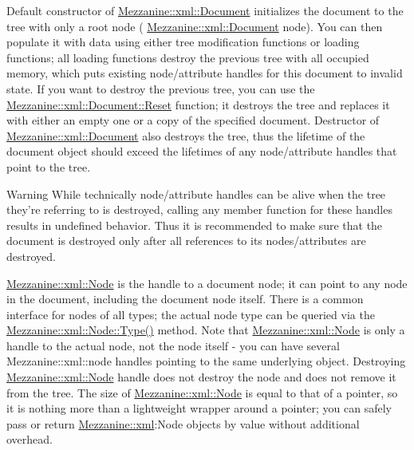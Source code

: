  \par
 Default constructor of \hyperlink{classMezzanine_1_1xml_1_1Document}{Mezzanine::xml::Document} initializes the document to the tree with only a root node ( \hyperlink{classMezzanine_1_1xml_1_1Document}{Mezzanine::xml::Document} node). You can then populate it with data using either tree modification functions or loading functions; all loading functions destroy the previous tree with all occupied memory, which puts existing node/attribute handles for this document to invalid state. If you want to destroy the previous tree, you can use the \hyperlink{classMezzanine_1_1xml_1_1Document_a4fc224fdb19ccc1ca410b4d49fc39f6c}{Mezzanine::xml::Document::Reset} function; it destroys the tree and replaces it with either an empty one or a copy of the specified document. Destructor of \hyperlink{classMezzanine_1_1xml_1_1Document}{Mezzanine::xml::Document} also destroys the tree, thus the lifetime of the document object should exceed the lifetimes of any node/attribute handles that point to the tree. \begin{DoxyWarning}{Warning}
While technically node/attribute handles can be alive when the tree they're referring to is destroyed, calling any member function for these handles results in undefined behavior. Thus it is recommended to make sure that the document is destroyed only after all references to its nodes/attributes are destroyed.
\end{DoxyWarning}
\hyperlink{classMezzanine_1_1xml_1_1Node}{Mezzanine::xml::Node} is the handle to a document node; it can point to any node in the document, including the document node itself. There is a common interface for nodes of all types; the actual node type can be queried via the \hyperlink{classMezzanine_1_1xml_1_1Node_a939a7a98e48ca8abb3349909586dd081}{Mezzanine::xml::Node::Type()} method. Note that \hyperlink{classMezzanine_1_1xml_1_1Node}{Mezzanine::xml::Node} is only a handle to the actual node, not the node itself -\/ you can have several Mezzanine::xml::node handles pointing to the same underlying object. Destroying \hyperlink{classMezzanine_1_1xml_1_1Node}{Mezzanine::xml::Node} handle does not destroy the node and does not remove it from the tree. The size of \hyperlink{classMezzanine_1_1xml_1_1Node}{Mezzanine::xml::Node} is equal to that of a pointer, so it is nothing more than a lightweight wrapper around a pointer; you can safely pass or return \hyperlink{namespaceMezzanine_1_1xml}{Mezzanine::xml}:Node objects by value without additional overhead. \par
 \par
